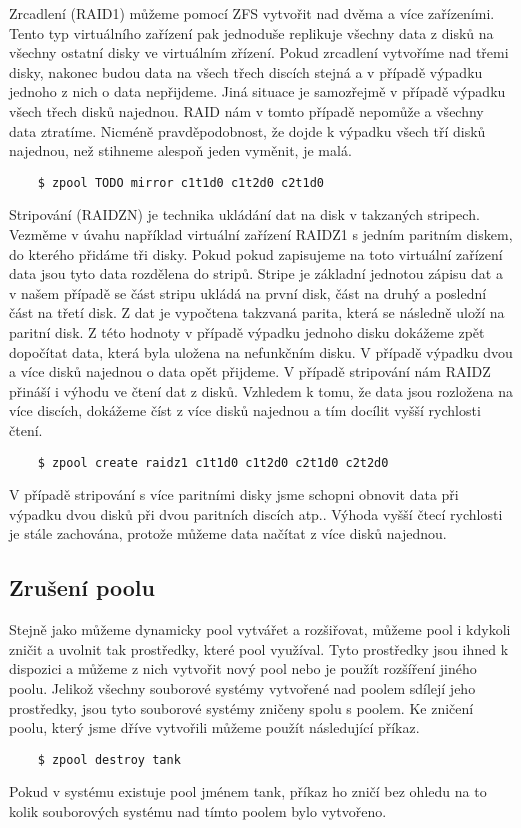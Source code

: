     Zrcadlení (RAID1) můžeme pomocí ZFS vytvořit nad dvěma a více zařízeními. Tento typ virtuálního zařízení pak jednoduše replikuje všechny data z disků na všechny ostatní disky
    ve virtuálním zřízení. Pokud zrcadlení vytvoříme nad třemi disky, nakonec budou data na všech třech discích stejná a v případě výpadku jednoho z nich o data nepřijdeme. Jiná situace je samozřejmě v případě výpadku všech třech disků najednou. RAID nám v tomto případě nepomůže a všechny data ztratíme. Nicméně pravděpodobnost, že dojde k výpadku všech
    tří disků najednou, než stihneme alespoň jeden vyměnit, je malá.
    \begin{verbatim}
    $ zpool TODO mirror c1t1d0 c1t2d0 c2t1d0
    \end{verbatim}

    Stripování (RAIDZN) je technika ukládání dat na disk v takzaných stripech. Vezměme v úvahu například virtuální zařízení RAIDZ1 s jedním paritním diskem, do kterého přidáme tři disky. Pokud pokud zapisujeme na toto virtuální zařízení data jsou tyto data rozdělena do stripů. Stripe je základní jednotou zápisu dat a v našem případě se část stripu ukládá na první disk, část na druhý a poslední část na třetí disk. Z dat je vypočtena takzvaná parita, která se následně uloží na paritní disk. Z této hodnoty v případě výpadku jednoho disku dokážeme zpět dopočítat data, která byla uložena na nefunkčním disku. V případě výpadku dvou a více disků najednou o data opět přijdeme. V případě stripování nám RAIDZ přináší i výhodu ve čtení dat z disků. Vzhledem k tomu, že data jsou rozložena na více discích, dokážeme číst z více disků najednou a tím docílit vyšší rychlosti čtení.
    \begin{verbatim}
    $ zpool create raidz1 c1t1d0 c1t2d0 c2t1d0 c2t2d0
    \end{verbatim}

    V případě stripování s více paritními disky jsme schopni obnovit data při výpadku dvou disků při dvou paritních discích atp.. Výhoda vyšší čtecí rychlosti je stále zachována, protože můžeme data načítat z více disků najednou.
    \subsection{Zrušení poolu}
    Stejně jako můžeme dynamicky pool vytvářet a rozšiřovat, můžeme pool i kdykoli zničit a uvolnit tak prostředky, které pool využíval. Tyto prostředky jsou ihned k dispozici a můžeme z nich vytvořit nový pool nebo je použít rozšíření jiného poolu. Jelikož všechny souborové systémy vytvořené nad poolem sdílejí jeho prostředky, jsou tyto souborové systémy zničeny spolu s poolem. Ke zničení poolu, který jsme dříve vytvořili můžeme použít následující příkaz.
    \begin{verbatim}
    $ zpool destroy tank
    \end{verbatim}
    Pokud v systému existuje pool jménem tank, příkaz ho zničí bez ohledu na to kolik souborových systému nad tímto poolem bylo vytvořeno.

